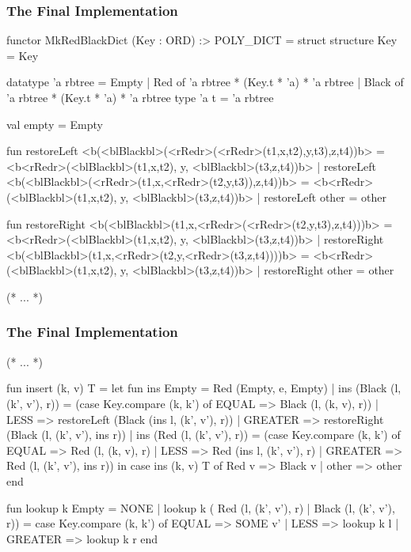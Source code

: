 \documentclass[aspectratio=169, handout]{beamer}
\begin{document}
\begin{frame}[fragile]
  \frametitle{The Final Implementation}

  \tiny

  \begin{codeblock}
    functor MkRedBlackDict (Key : ORD) :> POLY_DICT =
      struct
        structure Key = Key

        datatype 'a rbtree =
            Empty
          | Red of 'a rbtree * (Key.t * 'a) * 'a rbtree
          | Black of 'a rbtree * (Key.t * 'a) * 'a rbtree
        type 'a t = 'a rbtree

        val empty = Empty

        fun restoreLeft <b(<blBlackbl>(<rRedr>(<rRedr>(t1,x,t2),y,t3),z,t4))b> =
              <b<rRedr>(<blBlackbl>(t1,x,t2), y, <blBlackbl>(t3,z,t4))b>
          | restoreLeft <b(<blBlackbl>(<rRedr>(t1,x,<rRedr>(t2,y,t3)),z,t4))b> =
              <b<rRedr>(<blBlackbl>(t1,x,t2), y, <blBlackbl>(t3,z,t4))b>
          | restoreLeft other = other

        fun restoreRight <b(<blBlackbl>(t1,x,<rRedr>(<rRedr>(t2,y,t3),z,t4)))b> =
              <b<rRedr>(<blBlackbl>(t1,x,t2), y, <blBlackbl>(t3,z,t4))b>
          | restoreRight <b(<blBlackbl>(t1,x,<rRedr>(t2,y,<rRedr>(t3,z,t4))))b> =
              <b<rRedr>(<blBlackbl>(t1,x,t2), y, <blBlackbl>(t3,z,t4))b>
          | restoreRight other = other

        (* ... *)
  \end{codeblock}
\end{frame}

\begin{frame}[fragile]
  \frametitle{The Final Implementation}

  \tiny
  \begin{codeblock}
    (* ... *)

        fun insert (k, v) T =
          let
            fun ins Empty = Red (Empty, e, Empty)
              | ins (Black (l, (k', v'), r)) =
                  (case Key.compare (k, k') of
                    EQUAL   => Black (l, (k, v), r))
                  | LESS    => restoreLeft (Black (ins l, (k', v'), r))
                  | GREATER => restoreRight (Black (l, (k', v'), ins r))
              | ins (Red (l, (k', v'), r)) =
                  (case Key.compare (k, k') of
                    EQUAL   => Red (l, (k, v), r)
                  | LESS    => Red (ins l, (k', v'), r)
                  | GREATER => Red (l, (k', v'), ins r))
          in
            case ins (k, v) T of
              Red v => Black v
            | other => other
          end

        fun lookup k Empty = NONE
          | lookup k ( Red (l, (k', v'), r)
                     | Black (l, (k', v'), r)) =
              case Key.compare (k, k') of
                EQUAL   => SOME v'
              | LESS    => lookup k l
              | GREATER => lookup k r
      end
  \end{codeblock}
\end{frame}
\end{document}
